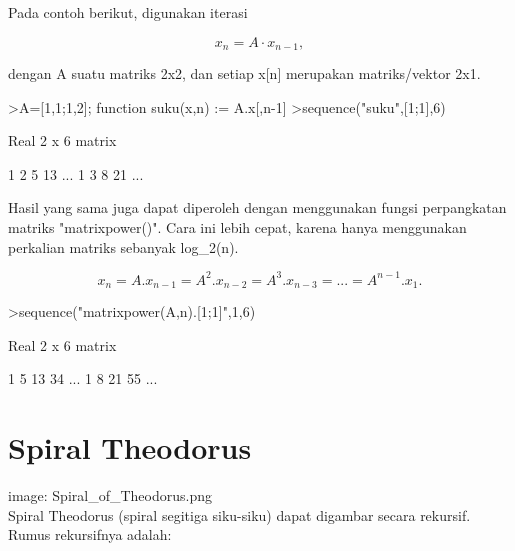 \documentclass{article}
\newenvironment{eulernotebook}{\par}{\par}
\newcommand{\eulerheading}[1]{\section{#1}}
\newenvironment{eulercomment}{\par\medskip}{\par\medskip}
\newenvironment{eulerformula}{}{}
\begin{document}
\begin{eulernotebook}
\begin{eulercomment}
\begin{eulercomment}
\begin{eulercomment}
\begin{eulercomment}
\begin{eulercomment}
Pada contoh berikut, digunakan iterasi

\end{eulercomment}
\begin{eulerformula}
\[
x_n =A \cdot x_{n-1},
\]
\end{eulerformula}
\begin{eulercomment}
dengan A suatu matriks 2x2, dan setiap x[n] merupakan matriks/vektor 2x1.
\end{eulercomment}
\begin{eulerprompt}
>A=[1,1;1,2]; function suku(x,n) := A.x[,n-1]
>sequence("suku",[1;1],6)
\end{eulerprompt}
\begin{euleroutput}
  Real 2 x 6 matrix
  
              1             2             5            13     ...
              1             3             8            21     ...
\end{euleroutput}
\begin{eulercomment}
Hasil yang sama juga dapat diperoleh dengan menggunakan fungsi perpangkatan matriks
"matrixpower()". Cara ini lebih cepat, karena hanya menggunakan perkalian matriks sebanyak
log\_2(n).

\end{eulercomment}
\begin{eulerformula}
\[
x_n=A.x_{n-1}=A^2.x_{n-2}=A^3.x_{n-3}= ... = A^{n-1}.x_1.
\]
\end{eulerformula}
\begin{eulerprompt}
>sequence("matrixpower(A,n).[1;1]",1,6)
\end{eulerprompt}
\begin{euleroutput}
  Real 2 x 6 matrix
  
              1             5            13            34     ...
              1             8            21            55     ...
\end{euleroutput}
\eulerheading{Spiral Theodorus}
\begin{eulercomment}
image: Spiral\_of\_Theodorus.png\\
Spiral Theodorus (spiral segitiga siku-siku) dapat digambar secara rekursif. Rumus
rekursifnya adalah:


\end{eulercomment}
\end{eulercomment}
\end{eulercomment}
\end{eulercomment}
\end{eulercomment}
\end{eulernotebook}
\end{document}
